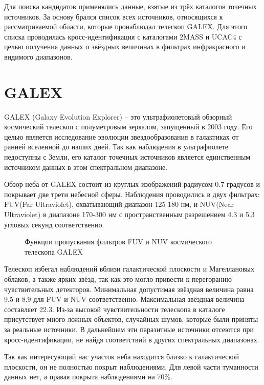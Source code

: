 Для поиска кандидатов применялись данные, взятые из трёх каталогов точечных источников. За основу брался список всех источников, относящихся к рассматриваемой области, которые пронаблюдал телескоп GALEX.
Для этого списка проводилась кросс-идентификация с каталогами 2MASS и UCAC4 с целью получения данных о звёздных величинах в фильтрах инфракрасного и видимого диапазонов. 


\section{GALEX}
GALEX (Galaxy Evolution Explorer) -- это ультрафиолетовый обзорный космический телескоп с полуметровым зеркалом, запущенный в 2003 году. Его целью является исследование эволюции звездообразования в галактиках от ранней вселенной до наших дней. Так как наблюдения в ультрафиолете недоступны с Земли, его каталог точечных источников является единственным источником данных в этом спектральном диапазоне.

Обзор неба от GALEX состоит из круглых изображений радиусом 0.7 градусов и покрывает две трети небесной сферы. Наблюдения проводились в двух фильтрах: FUV(Far Ultraviolet), охватывающий диапазон 125-180 нм, и NUV(Near Ultraviolet) в диапазоне 170-300 нм с пространственным разрешением 4.3 и 5.3 угловых секунд соответственно.


\begin{figure}[ht]
\hfill
\caption{Функции пропускания фильтров FUV и NUV космического телескопа GALEX}
\label{fig:filters}
\end{figure}

Телескоп избегал наблюдений вблизи галактической плоскости и Магеллановых облаков, а также ярких звёзд, так как это могло привести к перегоранию чувствительных детекторов. Минимальная допустимая звёздная величина равна 9.5 и 8.9 для FUV и NUV соответственно. Максимальная звёздная величина составляет 22.3. Из-за высокой чувствительности телескопа в каталоге присутствует много ложных объектов, случайных шумов, которые были приняты за реальные источники. В дальнейшем эти паразитные источники отсеются при кросс-идентификации, не найдя соответствий в других спектральных диапазонах.

Так как интересующий нас участок неба находится близко к галактической плоскости, он не полностью покрыт наблюдениями. Для левой части туманности данных нет, а правая покрыта наблюдениями на 70\%.

